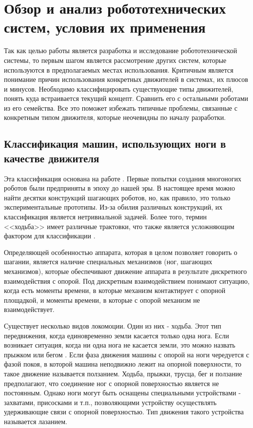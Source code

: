 \chapter{Обзор и анализ робототехнических систем, условия их применения}\label{ch:ch1}
Так как целью работы является разработка и исследование робототехнической системы, то первым шагом является рассмотрение других систем, которые используются в предполагаемых местах использования. Критичным является понимание причин использования конкретных движителей в системах, их плюсов и минусов. Необходимо классифицировать существующие типы движителей, понять куда встраивается текущий концепт. Сравнить его с остальными роботами из его семейства. Все это поможет избежать типичные проблемы, связанные с конкретным типом движителя, которые неочевидны по началу разработки.

\section{Классификация машин, использующих ноги в качестве движителя}
Эта классификация основана на работе \cite{Maloletov2015dinamica}. Первые попытки создания многоногих роботов были предприняты в эпоху до нашей эры. В настоящее время можно найти десятки конструкций шагающих роботов, но, как правило, это только экспериментальные прототипы. Из-за обилия различных конструкций, их классификация является нетривиальной задачей. Более того, термин <<ходьба>> имеет различные трактовки, что также является усложняющим фактором для классификации \cite{Bel1984,Brisk2009,Ohom1984,Pavl2013}. 

Определяющей особенностью аппарата, которая в целом позволяет говорить о шагании, является наличие специальных механизмов (ног, шагающих механизмов), которые обеспечивают движение аппарата в результате дискретного взаимодействия с опорой. Под дискретным взаимодействием понимают ситуацию, когда есть моменты времени, в которые механизм контактирует с опорной площадкой, и моменты времени, в которые с опорой механизм не взаимодействует.

Существует несколько видов локомоции. Один из них - ходьба. Этот тип передвижения, когда единовременно земли касается только одна нога. Если возникает ситуация, когда ни одна нога не касается земли, это можно назвать прыжком или бегом \cite{Ohom1984}. Если фаза движения машины с опорой на ноги чередуется с фазой покоя, в которой машина неподвижно лежит на опорной поверхности, то такое движение называется ползанием. Ходьба, прыжки, трусца, бег и ползание предполагают, что соединение ног с опорной поверхностью является не постоянным. Однако ноги могут быть оснащены специальными устройствами - захватами, присосками и т.п., позволяющими устройству осуществлять удерживающие связи с опорной поверхностью. Тип движения такого устройства называется лазанием.

